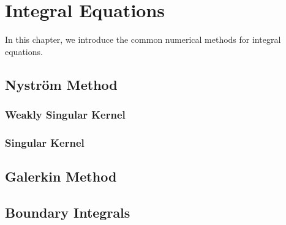 \chapter{Integral Equations}
In this chapter, we introduce the common numerical methods for integral equations.  
\section{Nystr\"om Method}
\subsection{Weakly Singular Kernel}
\subsection{Singular Kernel}

\section{Galerkin Method}

\section{Boundary Integrals}